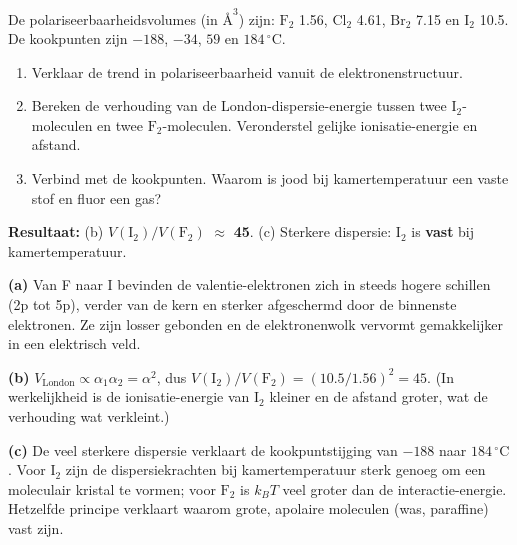 \begin{oefening}
De polariseerbaarheidsvolumes (in \(\text{Å}^3\)) zijn: \(\mathrm{F_2}\) 1.56, \(\mathrm{Cl_2}\) 4.61, \(\mathrm{Br_2}\) 7.15 en \(\mathrm{I_2}\) 10.5. De kookpunten zijn \(-188\), \(-34\), \(59\) en \(184\,^\circ\mathrm{C}\).

\begin{enumerate}
\item[(a)]
  Verklaar de trend in polariseerbaarheid vanuit de elektronenstructuur.
\item[(b)]
  Bereken de verhouding van de London-dispersie-energie tussen twee \(\mathrm{I_2}\)-moleculen en twee \(\mathrm{F_2}\)-moleculen. Veronderstel gelijke ionisatie-energie en afstand.
\item[(c)]
  Verbind met de kookpunten. Waarom is jood bij kamertemperatuur een vaste stof en fluor een gas?
\end{enumerate}
\end{oefening}
\begin{oplossing}
\textbf{Resultaat:} (b) \(V(\mathrm{I_2})/V(\mathrm{F_2})\) \ensuremath{\approx{}} \textbf{45}. (c) Sterkere dispersie: I\ensuremath{_{2}} is \textbf{vast} bij kamertemperatuur.

\textbf{(a)} Van F naar I bevinden de valentie-elektronen zich in steeds hogere schillen (2p tot 5p), verder van de kern en sterker afgeschermd door de binnenste elektronen. Ze zijn losser gebonden en de elektronenwolk vervormt gemakkelijker in een elektrisch veld.

\textbf{(b)} \(V_{\text{London}} \propto \alpha_1\alpha_2 = \alpha^2\), dus \(V(\mathrm{I_2})/V(\mathrm{F_2}) = (10.5/1.56)^2 = 45\). (In werkelijkheid is de ionisatie-energie van \(\mathrm{I_2}\) kleiner en de afstand groter, wat de verhouding wat verkleint.)

\textbf{(c)} De veel sterkere dispersie verklaart de kookpuntstijging van \(-188\) naar \(184\,^\circ\mathrm{C}\). Voor \(\mathrm{I_2}\) zijn de dispersiekrachten bij kamertemperatuur sterk genoeg om een moleculair kristal te vormen; voor \(\mathrm{F_2}\) is \(k_BT\) veel groter dan de interactie-energie. Hetzelfde principe verklaart waarom grote, apolaire moleculen (was, paraffine) vast zijn.
\end{oplossing}

